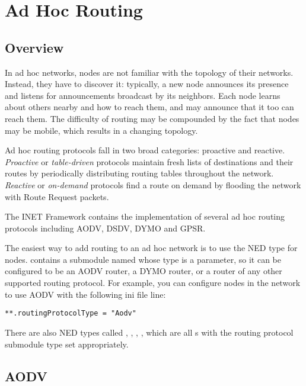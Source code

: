 \chapter{Ad Hoc Routing}
\label{cha:adhoc-routing}

\section{Overview}

In ad hoc networks, nodes are not familiar with the topology of 
their networks. Instead, they have to discover it: typically, 
a new node announces its presence and listens for announcements 
broadcast by its neighbors. Each node learns about others nearby 
and how to reach them, and may announce that it too can reach them.
The difficulty of routing may be compounded by the fact that
nodes may be mobile, which results in a changing topology.

Ad hoc routing protocols fall in two broad categories: proactive
and reactive. \textit{Proactive} or \textit{table-driven} protocols 
maintain fresh lists of destinations and their routes by periodically
distributing routing tables throughout the network.  
\textit{Reactive} or \textit{on-demand} protocols find a route on demand
by flooding the network with Route Request packets.

The INET Framework contains the implementation of several ad hoc routing
protocols including AODV, DSDV, DYMO and GPSR. 

The easiest way to add routing to an ad hoc network is to use the
 NED type for nodes. 
contains a submodule named  whose type is a parameter,
so it can be configured to be an AODV router, a DYMO router, or a
router of any other supported routing protocol. For example, you
can configure  nodes in the network to use
AODV with the following ini file line:

\begin{verbatim}
**.routingProtocolType = "Aodv"
\end{verbatim}

There are also NED types called , ,
, , which are all 
s with the routing protocol submodule type 
set appropriately.


\section{AODV}
\label{sec:aodv}

